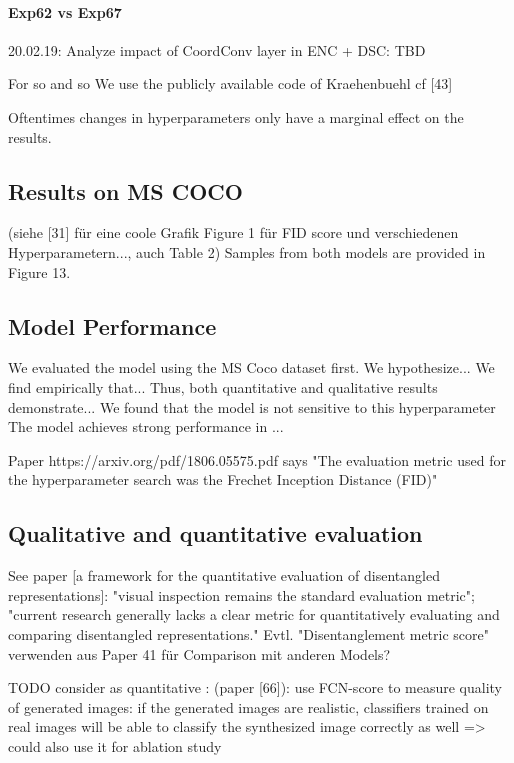 \documentclass[12pt,a4paper]{article}
\begin{document}
\paragraph{Exp62 vs Exp67} 20.02.19: Analyze impact of CoordConv layer in ENC + DSC: TBD

\par For so and so We use the publicly available code of Kraehenbuehl cf [43]

\par Oftentimes changes in hyperparameters only have a marginal effect on the results.

\subsection{Results on MS COCO}
(siehe [31] für eine coole Grafik Figure 1 für FID score und verschiedenen Hyperparametern..., auch Table 2)
Samples from both models are provided in Figure 13.

\subsection{Model Performance}
We evaluated the model using the MS Coco dataset first.
We hypothesize...
We find empirically that...
Thus, both quantitative and qualitative results demonstrate...
We found that the model is not sensitive to this hyperparameter
The model achieves strong performance in ...

\par Paper https://arxiv.org/pdf/1806.05575.pdf says "The evaluation metric used for the hyperparameter search was the Frechet Inception Distance (FID)"

\subsection{Qualitative and quantitative evaluation}
See paper [a framework for the quantitative evaluation of disentangled representations]: "visual inspection remains the standard evaluation metric"; "current research generally lacks a clear metric for quantitatively evaluating and comparing disentangled representations."
Evtl. "Disentanglement metric score" verwenden aus Paper 41 für Comparison mit anderen Models?

\par TODO consider as quantitative : (paper [66]): use FCN-score to measure quality of generated images: if the generated images are realistic, classifiers trained on real images will be able to classify the synthesized image correctly as well => could also use it for ablation study
\end{document}
